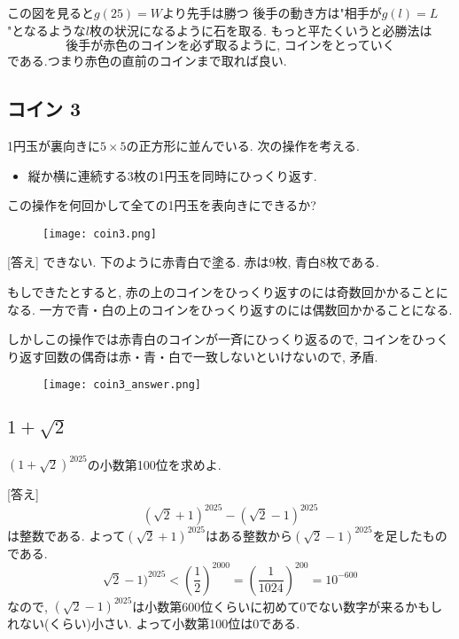 \documentclass[dvipdfmx,a4paper,12pt]{article} %
\theoremstyle{definition}
\theoremstyle{remark}
\numberwithin{equation}{section}
\begin{document}
この図を見ると$g(25)=W$より先手は勝つ
後手の動き方は"相手が$g(l)=L$"となるような$l$枚の状況になるように石を取る. 
もっと平たくいうと必勝法は
$$
\text{後手が赤色のコインを必ず取るように, コインをとっていく}
$$
である.つまり赤色の直前のコインまで取れば良い. 


\subsection{コイン 3}
\begin{tcolorbox}[mybox]
1円玉が裏向きに$5 \times 5$の正方形に並んでいる.
次の操作を考える. 
\begin{itemize}
\item 縦か横に連続する3枚の1円玉を同時にひっくり返す.
\end{itemize}

 この操作を何回かして全ての1円玉を表向きにできるか?
 \end{tcolorbox}
 
 \begin{figure}[htbp]
\begin{center}
\texttt{[image: coin3.png]}
\end{center}
\end{figure}

[答え]
できない. 下のように赤青白で塗る.
赤は9枚, 青白8枚である. 

もしできたとすると, 赤の上のコインをひっくり返すのには奇数回かかることになる. 
一方で青・白の上のコインをひっくり返すのには偶数回かかることになる. 

しかしこの操作では赤青白のコインが一斉にひっくり返るので, コインをひっくり返す回数の偶奇は赤・青・白で一致しないといけないので, 矛盾. 
 \begin{figure}[htbp]
\begin{center}
\texttt{[image: coin3\_answer.png]}
\end{center}
\end{figure}


\subsection{$1 + \sqrt{2}$}
\begin{tcolorbox}[mybox]
$(1 + \sqrt{2})^{2025}$の小数第100位を求めよ.
 \end{tcolorbox}
 
 [答え]
 $$
 (\sqrt{2} +  1)^{2025} - (\sqrt{2} - 1)^{2025}
 $$
は整数である.
 よって$ (\sqrt{2} +  1)^{2025} $はある整数から$(\sqrt{2} - 1)^{2025}$を足したものである. 
 $$
 \sqrt{2} - 1)^{2025}
 <  \left(\frac{1}{2}\right)^{2000} =  \left(\frac{1}{1024}\right)^{200} = 10^{-600}
 $$
 なので, $ (\sqrt{2} - 1)^{2025}$は小数第600位くらいに初めて0でない数字が来るかもしれない(くらい)小さい.
よって小数第100位は0である. 
 
\end{document}
